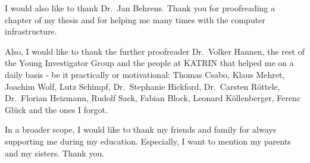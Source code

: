 I would also like to thank Dr.~Jan Behrens. Thank you for proofreading a chapter of my thesis and for helping me many times with the computer infrastructure.


Also, I would like to thank the further proofreader Dr.~Volker Hannen, the rest of the Young Investigator Group and the people at KATRIN that helped me on a daily basis - be it practically or motivational: Thomas Csabo, Klaus Mehret, Joachim Wolf, Lutz Schimpf, Dr.~Stephanie Hickford, Dr.~Carsten Röttele, Dr.~Florian Heizmann, Rudolf Sack, Fabian Block, Leonard Köllenberger, Ferenc Glück and the ones I forgot. 


In a broader scope, I would like to thank my friends and family for always supporting me during my education. Especially, I want to mention my parents and my sisters. Thank you.